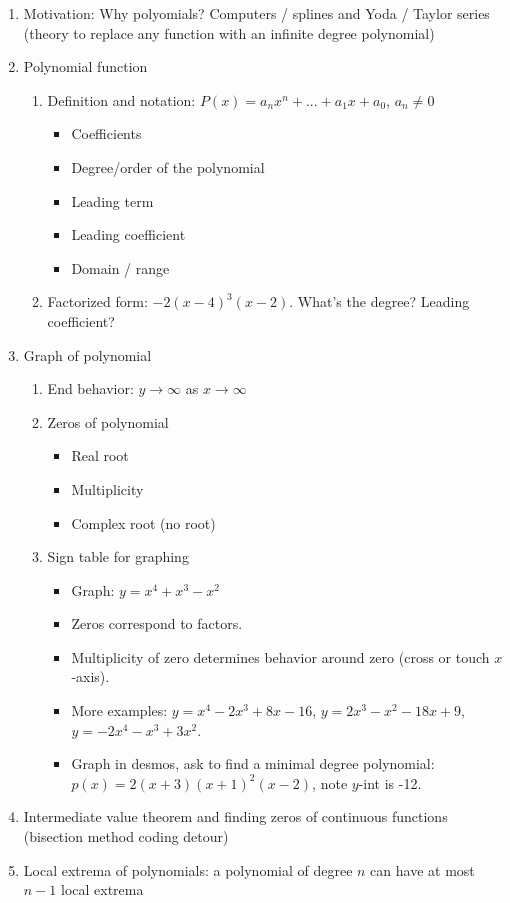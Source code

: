 \documentclass{article}
\begin{document}
\begin{enumerate}
\item Motivation: Why polyomials? Computers / splines and Yoda / Taylor series (theory to replace any function with an infinite degree polynomial)

\item Polynomial function
\begin{enumerate}

\item Definition and notation: $P(x) = a_nx^n + ... + a_1x+a_0$, $a_n\neq 0$
\begin{itemize}
\item Coefficients
\item Degree/order of the polynomial
\item Leading term
\item Leading coefficient
\item Domain / range
\end{itemize}

\item Factorized form: $-2(x-4)^3(x-2)$. What's the degree? Leading coefficient?
\end{enumerate}

\item Graph of polynomial
\begin{enumerate}
\item End behavior: $y\rightarrow \infty$ as $x\rightarrow \infty$
\item Zeros of polynomial
\begin{itemize}
\item Real root
\item Multiplicity
\item Complex root (no root)
\end{itemize}

\item Sign table for graphing
\begin{itemize}
\item Graph: $y = x^4 + x^3-x^2$
\item Zeros correspond to factors. 
\item Multiplicity of zero determines behavior around zero (cross or touch $x$-axis).
\item More examples: $y=x^4-2x^3+8x-16$, $y=2x^3-x^2-18x+9$, $y=-2x^4-x^3+3x^2$. 
\item Graph in desmos, ask to find a minimal degree polynomial: $p(x)=2(x+3)(x+1)^2(x-2)$, note $y$-int is -12.
\end{itemize}
\end{enumerate}

\item Intermediate value theorem and finding zeros of continuous functions (bisection method coding detour)
\item Local extrema of polynomials: a polynomial of degree $n$ can have at most $n-1$ local extrema
\end{enumerate}
\end{document}
